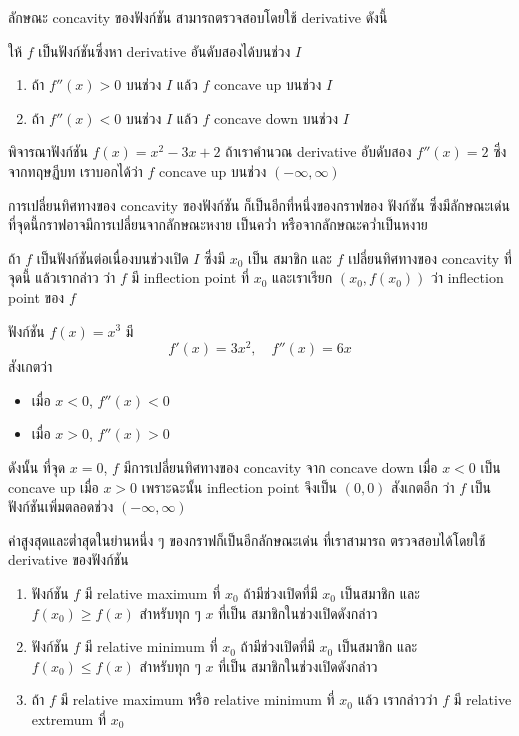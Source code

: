 \documentclass[
]{book}
\begin{document}
ลักษณะ concavity ของฟังก์ชัน สามารถตรวจสอบโดยใช้ derivative ดังนี้

ให้ \(f\) เป็นฟังก์ชันซึ่งหา derivative อันดับสองได้บนช่วง \(I\)

\begin{enumerate}
\def\labelenumi{\arabic{enumi}.}
\item
  ถ้า \(f''(x) > 0\) บนช่วง \(I\) แล้ว \(f\) concave up บนช่วง \(I\)
\item
  ถ้า \(f''(x) < 0\) บนช่วง \(I\) แล้ว \(f\) concave down บนช่วง \(I\)
\end{enumerate}

พิจารณาฟังก์ชัน \(f(x) = x^2-3x+2\) ถ้าเราคำนวณ derivative อับดับสอง
\(f''(x) = 2\) ซึ่งจากทฤษฏีบท เราบอกได้ว่า \(f\) concave up บนช่วง
\((-\infty,\infty)\)

การเปลี่ยนทิศทางของ concavity ของฟังก์ชัน ก็เป็นอีกที่หนึ่งของกราฟของ ฟังก์ชัน
ซึ่งมีลักษณะเด่น ที่จุดนี้กราฟอาจมีการเปลี่ยนจากลักษณะหงาย เป็นคว่ำ
หรือจากลักษณะคว่ำเป็นหงาย

ถ้า \(f\) เป็นฟังก์ชันต่อเนื่องบนช่วงเปิด \(I\) ซึ่งมี \(x_0\) เป็น สมาชิก และ \(f\)
เปลี่ยนทิศทางของ concavity ที่จุดนี้ แล้วเรากล่าว ว่า \(f\) มี inflection point ที่
\(x_0\) และเราเรียก \((x_0,f(x_0))\) ว่า inflection point ของ \(f\)

ฟังก์ชัน \(f(x) = x^3\) มี \[f'(x) = 3x^2, \quad f''(x) = 6x\] สังเกตว่า

\begin{itemize}
\item
  เมื่อ \(x<0\), \(f''(x) < 0\)
\item
  เมื่อ \(x>0\), \(f''(x) >0\)
\end{itemize}

ดังนั้น ที่จุด \(x=0\), \(f\) มีการเปลี่ยนทิศทางของ concavity จาก concave down เมื่อ
\(x<0\) เป็น concave up เมื่อ \(x>0\) เพราะฉะนั้น inflection point จึงเป็น
\((0,0)\) สังเกตอีก ว่า \(f\) เป็นฟังก์ชันเพิ่มตลอดช่วง \((-\infty,\infty)\)

ค่าสูงสุดและต่ำสุดในย่านหนึ่ง ๆ ของกราฟก็เป็นอีกลักษณะเด่น ที่เราสามารถ ตรวจสอบได้โดยใช้
derivative ของฟังก์ชัน

\begin{enumerate}
\def\labelenumi{\arabic{enumi}.}
\item
  ฟังก์ชัน \(f\) มี relative maximum ที่ \(x_0\) ถ้ามีช่วงเปิดที่มี \(x_0\) เป็นสมาชิก
  และ \(f(x_0) \ge f(x)\) สำหรับทุก ๆ \(x\) ที่เป็น สมาชิกในช่วงเปิดดังกล่าว
\item
  ฟังก์ชัน \(f\) มี relative minimum ที่ \(x_0\) ถ้ามีช่วงเปิดที่มี \(x_0\) เป็นสมาชิก
  และ \(f(x_0) \le f(x)\) สำหรับทุก ๆ \(x\) ที่เป็น สมาชิกในช่วงเปิดดังกล่าว
\item
  ถ้า \(f\) มี relative maximum หรือ relative minimum ที่ \(x_0\) แล้ว
  เรากล่าวว่า \(f\) มี relative extremum ที่ \(x_0\)
\end{enumerate}
\end{document}
